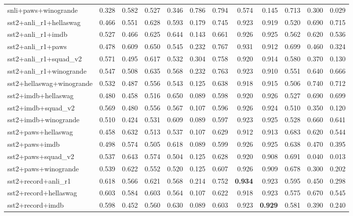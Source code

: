 \begin{table}[t]
\begin{tabular}{lrrrrrrrrrrr}
    snli+paws+winogrande & 0.328 & 0.582 & 0.527 & 0.346 & 0.786 & 0.794 & 0.574 & 0.145 & 0.713 & 0.300 & 0.029 \\
    sst2+anli\_r1+hellaswag & 0.466 & 0.551 & 0.628 & 0.593 & 0.179 & 0.745 & 0.923 & 0.919 & 0.520 & 0.690 & 0.715 \\
    sst2+anli\_r1+imdb & 0.527 & 0.466 & 0.625 & 0.644 & 0.143 & 0.661 & 0.926 & 0.925 & 0.562 & 0.620 & 0.536 \\
    sst2+anli\_r1+paws & 0.478 & 0.609 & 0.650 & 0.545 & 0.232 & 0.767 & 0.931 & 0.912 & 0.699 & 0.460 & 0.324 \\
    sst2+anli\_r1+squad\_v2 & 0.571 & 0.495 & 0.617 & 0.532 & 0.304 & 0.758 & 0.920 & 0.914 & 0.580 & 0.370 & 0.130 \\
    sst2+anli\_r1+winogrande & 0.547 & 0.508 & 0.635 & 0.568 & 0.232 & 0.763 & 0.923 & 0.910 & 0.551 & 0.640 & 0.666 \\
    sst2+hellaswag+winogrande & 0.532 & 0.487 & 0.556 & 0.543 & 0.125 & 0.638 & 0.918 & 0.915 & 0.506 & 0.740 & 0.712 \\
    sst2+imdb+hellaswag & 0.480 & 0.458 & 0.516 & 0.650 & 0.089 & 0.598 & 0.920 & 0.926 & 0.527 & 0.690 & 0.699 \\
    sst2+imdb+squad\_v2 & 0.569 & 0.480 & 0.556 & 0.567 & 0.107 & 0.596 & 0.926 & 0.924 & 0.510 & 0.350 & 0.120 \\
    sst2+imdb+winogrande & 0.510 & 0.424 & 0.531 & 0.609 & 0.089 & 0.597 & 0.923 & 0.925 & 0.528 & 0.660 & 0.641 \\
    sst2+paws+hellaswag & 0.458 & 0.632 & 0.513 & 0.537 & 0.107 & 0.629 & 0.912 & 0.913 & 0.683 & 0.620 & 0.544 \\
    sst2+paws+imdb & 0.498 & 0.574 & 0.505 & 0.618 & 0.089 & 0.599 & 0.926 & 0.925 & 0.638 & 0.470 & 0.395 \\
    sst2+paws+squad\_v2 & 0.537 & 0.643 & 0.574 & 0.504 & 0.125 & 0.628 & 0.920 & 0.908 & 0.691 & 0.040 & 0.013 \\
    sst2+paws+winogrande & 0.539 & 0.622 & 0.552 & 0.520 & 0.125 & 0.607 & 0.926 & 0.909 & 0.678 & 0.300 & 0.202 \\
    sst2+record+anli\_r1 & 0.618 & 0.566 & 0.621 & 0.568 & 0.214 & 0.752 & \textbf{0.934} & 0.923 & 0.595 & 0.450 & 0.298 \\
    sst2+record+hellaswag & 0.603 & 0.584 & 0.603 & 0.564 & 0.107 & 0.622 & 0.918 & 0.923 & 0.575 & 0.670 & 0.545 \\
    sst2+record+imdb & 0.598 & 0.452 & 0.560 & 0.630 & 0.089 & 0.603 & 0.923 & \textbf{0.929} & 0.581 & 0.390 & 0.240 \\

\end{tabular}
\end{table}
